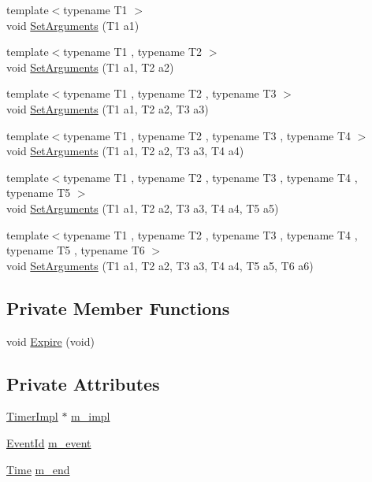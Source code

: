 \begin{DoxyCompactItemize}
\item 
{\footnotesize template$<$typename T1 $>$ }\\void \hyperlink{classns3_1_1Watchdog_a925bc97bcf93e6a312f45f0c03f9cbf8}{Set\+Arguments} (T1 a1)
\item 
{\footnotesize template$<$typename T1 , typename T2 $>$ }\\void \hyperlink{classns3_1_1Watchdog_a7667676ab20ebc972bc52858ecfc11ba}{Set\+Arguments} (T1 a1, T2 a2)
\item 
{\footnotesize template$<$typename T1 , typename T2 , typename T3 $>$ }\\void \hyperlink{classns3_1_1Watchdog_a137dfdff46aa0bbb9556aefe0d6c60fd}{Set\+Arguments} (T1 a1, T2 a2, T3 a3)
\item 
{\footnotesize template$<$typename T1 , typename T2 , typename T3 , typename T4 $>$ }\\void \hyperlink{classns3_1_1Watchdog_a444ddd6030627f41fce62c767261c4ff}{Set\+Arguments} (T1 a1, T2 a2, T3 a3, T4 a4)
\item 
{\footnotesize template$<$typename T1 , typename T2 , typename T3 , typename T4 , typename T5 $>$ }\\void \hyperlink{classns3_1_1Watchdog_aa27364592e9e7d8f2b4fed7db9530d1f}{Set\+Arguments} (T1 a1, T2 a2, T3 a3, T4 a4, T5 a5)
\item 
{\footnotesize template$<$typename T1 , typename T2 , typename T3 , typename T4 , typename T5 , typename T6 $>$ }\\void \hyperlink{classns3_1_1Watchdog_a0cfaf7d908bb9328dda48266780557bc}{Set\+Arguments} (T1 a1, T2 a2, T3 a3, T4 a4, T5 a5, T6 a6)
\end{DoxyCompactItemize}

\subsection*{Private Member Functions}
\begin{DoxyCompactItemize}
\item 
void \hyperlink{classns3_1_1Watchdog_a483d1c00751c98629f3c128453b0cfb2}{Expire} (void)
\end{DoxyCompactItemize}
\subsection*{Private Attributes}
\begin{DoxyCompactItemize}
\item 
\hyperlink{classns3_1_1TimerImpl}{Timer\+Impl} $\ast$ \hyperlink{classns3_1_1Watchdog_ac8ff50cdff62e1549d5a5e8973003a9a}{m\+\_\+impl}
\item 
\hyperlink{classns3_1_1EventId}{Event\+Id} \hyperlink{classns3_1_1Watchdog_a7d8678d211f73cfc2541649ce534d2db}{m\+\_\+event}
\item 
\hyperlink{classns3_1_1Time}{Time} \hyperlink{classns3_1_1Watchdog_aec3be76124b68f4ff3ec9331d7f23a3f}{m\+\_\+end}
\end{DoxyCompactItemize}


